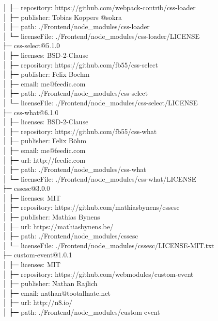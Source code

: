 │  ├─ repository: https://github.com/webpack-contrib/css-loader\\
│  ├─ publisher: Tobias Koppers @sokra\\
│  ├─ path: ./Frontend/node\_modules/css-loader\\
│  └─ licenseFile: ./Frontend/node\_modules/css-loader/LICENSE\\
├─ css-select@5.1.0\\
│  ├─ licenses: BSD-2-Clause\\
│  ├─ repository: https://github.com/fb55/css-select\\
│  ├─ publisher: Felix Boehm\\
│  ├─ email: me@feedic.com\\
│  ├─ path: ./Frontend/node\_modules/css-select\\
│  └─ licenseFile: ./Frontend/node\_modules/css-select/LICENSE\\
├─ css-what@6.1.0\\
│  ├─ licenses: BSD-2-Clause\\
│  ├─ repository: https://github.com/fb55/css-what\\
│  ├─ publisher: Felix Böhm\\
│  ├─ email: me@feedic.com\\
│  ├─ url: http://feedic.com\\
│  ├─ path: ./Frontend/node\_modules/css-what\\
│  └─ licenseFile: ./Frontend/node\_modules/css-what/LICENSE\\
├─ cssesc@3.0.0\\
│  ├─ licenses: MIT\\
│  ├─ repository: https://github.com/mathiasbynens/cssesc\\
│  ├─ publisher: Mathias Bynens\\
│  ├─ url: https://mathiasbynens.be/\\
│  ├─ path: ./Frontend/node\_modules/cssesc\\
│  └─ licenseFile: ./Frontend/node\_modules/cssesc/LICENSE-MIT.txt\\
├─ custom-event@1.0.1\\
│  ├─ licenses: MIT\\
│  ├─ repository: https://github.com/webmodules/custom-event\\
│  ├─ publisher: Nathan Rajlich\\
│  ├─ email: nathan@tootallnate.net\\
│  ├─ url: http://n8.io/\\
│  ├─ path: ./Frontend/node\_modules/custom-event\\
